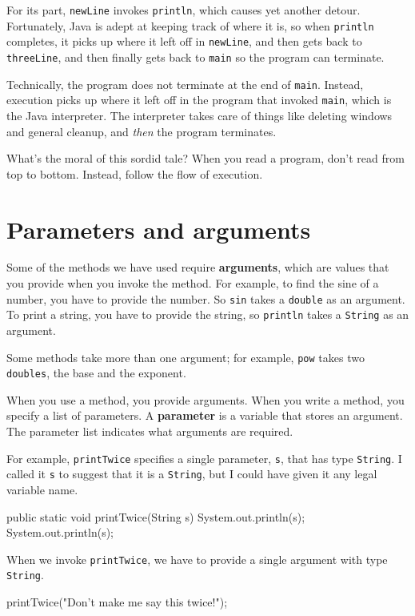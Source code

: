 For its part, {\tt newLine} invokes
{\tt println}, which causes yet another detour.  Fortunately,
Java is adept at keeping track of where it is, so when
{\tt println} completes, it picks up where it left off in
{\tt newLine}, and then gets back to {\tt threeLine}, and then
finally gets back to {\tt main} so the program can terminate.

Technically, the program does not terminate at the
end of {\tt main}.  Instead, execution picks up where it left
off in the program that invoked {\tt main}, which is the
Java interpreter.  The interpreter takes care of things
like deleting windows and general cleanup, and {\em then}
the program terminates.

What's the moral of this sordid tale?  When you
read a program, don't read from top to bottom.  Instead,
follow the flow of execution.


\section{Parameters and arguments}

Some of the methods we have used require {\bf arguments},
which are values that you provide when you invoke the method.
For example, to find the sine of a number,
you have to provide the number.  So {\tt sin}
takes a {\tt double} as an argument.  To print a string,
you have to provide the string, so {\tt println}
takes a {\tt String} as an argument.

Some methods take more than one argument; for example, {\tt pow}
takes two {\tt doubles}, the base and the exponent.

When you use a method, you provide arguments.  When you write
a method, you specify a list of parameters.  A {\bf parameter}
is a variable that stores an argument.  The parameter list
indicates what arguments are required.

For example, {\tt printTwice} specifies a single parameter,
{\tt s}, that has type {\tt String}.  I called it {\tt s} to
suggest that it is a {\tt String}, but I could have given it
any legal variable name.

\begin{code}
    public static void printTwice(String s) {
        System.out.println(s);
        System.out.println(s);
    }
\end{code}
%
When we invoke {\tt printTwice}, we have to provide
a single argument with type {\tt String}.

\begin{code}
    printTwice("Don't make me say this twice!");
\end{code}

